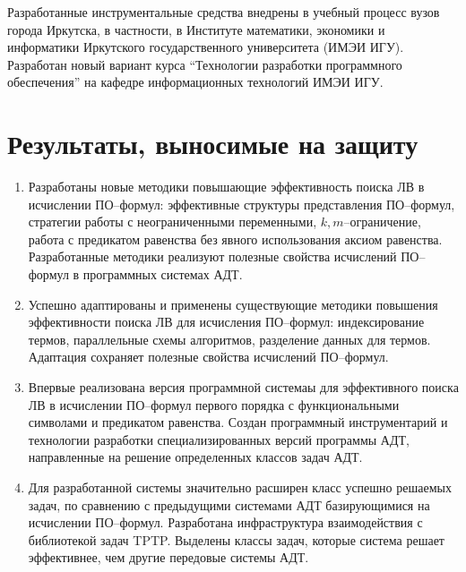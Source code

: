 Разработанные инструментальные средства внедрены в учебный процесс вузов города Иркутска, в частности, в Институте математики, экономики и информатики Иркутского государственного университета (ИМЭИ ИГУ). Разработан новый вариант курса ``Технологии разработки программного обеспечения'' на кафедре информационных технологий ИМЭИ ИГУ.



\section*{Результаты, выносимые на защиту}
\begin{enumerate}

\item Разработаны новые методики повышающие эффективность поиска ЛВ в исчислении ПО--формул: эффективные структуры представления ПО--формул, стратегии работы с неограниченными переменными, $k,m$--ограничение, работа с предикатом равенства без явного использования аксиом равенства. Разработанные методики реализуют полезные свойства исчислений ПО--формул в программных системах АДТ.

\item Успешно адаптированы и применены существующие методики повышения эффективности поиска ЛВ для исчисления ПО--формул: индексирование термов, параллельные схемы алгоритмов, разделение данных для термов. Адаптация сохраняет полезные свойства исчислений ПО--формул.

\item Впервые реализована версия программной системаы для эффективного поиска ЛВ в исчислении ПО--формул первого порядка с функциональными символами и предикатом равенства. Создан программный инструментарий и технологии разработки специализированных версий программы АДТ, направленные на решение определенных классов задач АДТ.

\item Для разработанной системы значительно расширен класс успешно решаемых задач, по сравнению с предыдущими системами АДТ базирующимися на исчислении ПО--формул. Разработана инфраструктура взаимодействия с библиотекой задач TPTP. Выделены классы задач, которые система решает эффективнее, чем другие передовые системы АДТ.
\end{enumerate}



